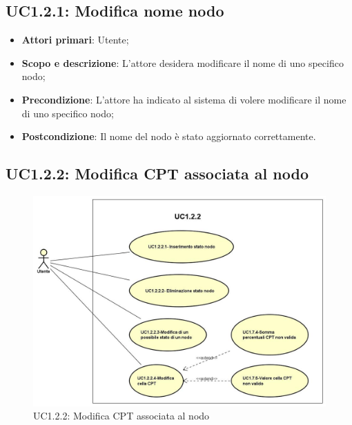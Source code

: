 \subsection{UC1.2.1: Modifica nome nodo} 
\hypertarget{UC1.2.1}{} 
\begin{itemize} 
	\item{\textbf{Attori primari}: Utente;} 
	\item{\textbf{Scopo e descrizione}: L'attore desidera modificare il nome di uno specifico nodo;} 
	\item{\textbf{Precondizione}: L'attore ha indicato al sistema di volere modificare il nome di uno specifico nodo;} 
	\item{\textbf{Postcondizione}: Il nome del nodo è stato aggiornato correttamente.} 
\end{itemize} 
\subsection{UC1.2.2: Modifica CPT associata al nodo} 
\hypertarget{UC1.2.2}{} 
\begin{figure} [H]
	\centering
	\includegraphics[scale=0.45]{Img/UC1-2-2} 
	\caption{UC1.2.2: Modifica CPT associata al nodo} \label{} 
\end{figure} 
